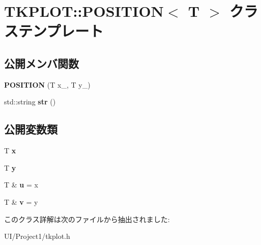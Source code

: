 \hypertarget{class_t_k_p_l_o_t_1_1_p_o_s_i_t_i_o_n}{}\section{T\+K\+P\+L\+OT\+:\+:P\+O\+S\+I\+T\+I\+ON$<$ T $>$ クラステンプレート}
\label{class_t_k_p_l_o_t_1_1_p_o_s_i_t_i_o_n}
\subsection*{公開メンバ関数}
\begin{DoxyCompactItemize}
\item 
\mbox{\label{class_t_k_p_l_o_t_1_1_p_o_s_i_t_i_o_n_abce2e3b6b659c15133abef1c6e35fe1c}} 
{\bfseries P\+O\+S\+I\+T\+I\+ON} (T x\+\_\+, T y\+\_\+)
\item 
\mbox{\label{class_t_k_p_l_o_t_1_1_p_o_s_i_t_i_o_n_a715ead8ec7884aaca1ec220e77c83b03}} 
std\+::string {\bfseries str} ()
\end{DoxyCompactItemize}
\subsection*{公開変数類}
\begin{DoxyCompactItemize}
\item 
\mbox{\label{class_t_k_p_l_o_t_1_1_p_o_s_i_t_i_o_n_a260fc49a5e31e7dd5d42fc01b05a88f7}} 
T {\bfseries x}
\item 
\mbox{\label{class_t_k_p_l_o_t_1_1_p_o_s_i_t_i_o_n_ae84c7221f133098571c5389d76285591}} 
T {\bfseries y}
\item 
\mbox{\label{class_t_k_p_l_o_t_1_1_p_o_s_i_t_i_o_n_a023ad2c7a8239540613a5b18c70772ff}} 
T \& {\bfseries u} = x
\item 
\mbox{\label{class_t_k_p_l_o_t_1_1_p_o_s_i_t_i_o_n_a776d51b19318a7177128c435eae80a48}} 
T \& {\bfseries v} = y
\end{DoxyCompactItemize}


このクラス詳解は次のファイルから抽出されました\+:\begin{DoxyCompactItemize}
\item 
U\+I/\+Project1/tkplot.\+h\end{DoxyCompactItemize}
